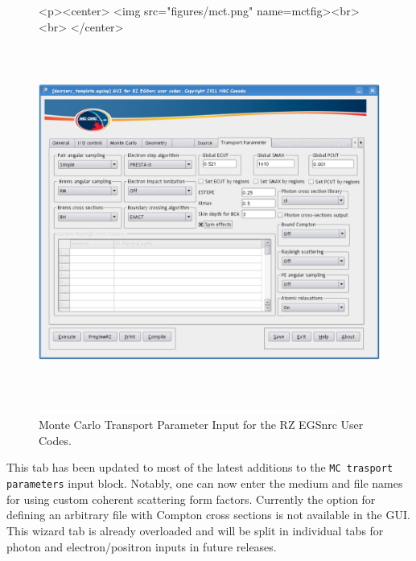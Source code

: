\documentclass[12pt,twoside]{article}   %
\begin{document}
\begin{figure}[htb]
\begin{htmlonly}
\begin{rawhtml}
<p><center>
<img src="figures/mct.png" name=mctfig><br><br>
</center>
\end{rawhtml}
\end{htmlonly}
\begin{latexonly}
\begin{center}
\includegraphics[height=11.56cm]{figures/mct}
\end{center}
\end{latexonly}
\begin{center}
\includegraphics[height=1mm]{figures/fake2}
\end{center}
\caption{Monte Carlo Transport Parameter Input for the RZ EGSnrc User Codes.}
\label{mctfig}
\end{figure}

This tab has been updated to most of the latest additions to the {\tt MC trasport parameters}
input block. Notably, one can now enter the medium and file names for using custom coherent
scattering form factors. Currently the option for defining an arbitrary file with Compton
cross sections is not available in the GUI. This wizard tab is already overloaded and will
be split in individual tabs for photon and electron/positron inputs in future releases.
\end{document}

